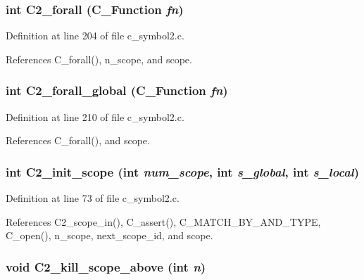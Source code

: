 \subsubsection{\setlength{\rightskip}{0pt plus 5cm}int C2\_\-forall (\bf{C\_\-Function} {\em fn})}\label{c__symbol2_8c_816569187eee3bb41af18b008426f2a5}




Definition at line 204 of file c\_\-symbol2.c.

References C\_\-forall(), n\_\-scope, and scope.
\subsubsection{\setlength{\rightskip}{0pt plus 5cm}int C2\_\-forall\_\-global (\bf{C\_\-Function} {\em fn})}\label{c__symbol2_8c_c46d4d43a915430a8c369672dcb86093}




Definition at line 210 of file c\_\-symbol2.c.

References C\_\-forall(), and scope.
\subsubsection{\setlength{\rightskip}{0pt plus 5cm}int C2\_\-init\_\-scope (int {\em num\_\-scope}, int {\em s\_\-global}, int {\em s\_\-local})}\label{c__symbol2_8c_4bb831b4735b9acdd8bd65ef83b28354}




Definition at line 73 of file c\_\-symbol2.c.

References C2\_\-scope\_\-in(), C\_\-assert(), C\_\-MATCH\_\-BY\_\-AND\_\-TYPE, C\_\-open(), n\_\-scope, next\_\-scope\_\-id, and scope.
\subsubsection{\setlength{\rightskip}{0pt plus 5cm}void C2\_\-kill\_\-scope\_\-above (int {\em n})}\label{c__symbol2_8c_371a41afbac17260e344b11ea920a83b}




